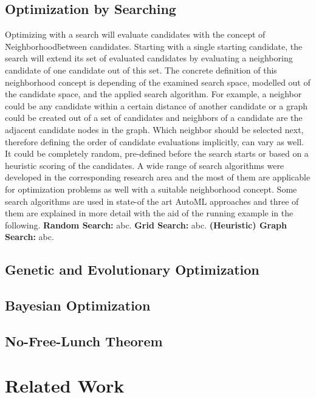 \subsection{Optimization by Searching}
\label{sec:theory:optimization:search}
Optimizing with a search will evaluate candidates with the concept of \"Neighborhood\" between candidates.
Starting with a single starting candidate, the search will extend its set of evaluated candidates by evaluating a neighboring candidate of one candidate out of this set.
The concrete definition of this neighborhood concept is depending of the examined search space, modelled out of the candidate space, and the applied search algorithm.
For example, a neighbor could be any candidate within a certain distance of another candidate or a graph could be created out of a set of candidates and neighbors of a candidate are the adjacent candidate nodes in the graph.
Which neighbor should be selected next, therefore defining the order of candidate evaluations implicitly, can vary as well.
It could be completely random, pre-defined before the search starts or based on a heuristic scoring of the candidates.\newline
A wide range of search algorithms were developed in the corresponding research area and the most of them are applicable for optimization problems as well with a suitable neighborhood concept.
Some search algorithms are used in state-of the art AutoML approaches and three of them are explained in more detail with the aid of the running example in the following.\newline
\newline
\textbf{Random Search:} abc.\newline
\newline
\textbf{Grid Search:} abc.\newline
\newline
\textbf{(Heuristic) Graph Search:} abc.

\subsection{Genetic and Evolutionary Optimization}
\label{sec:theory:optimization:genetic}

\Blindtext

\subsection{Bayesian Optimization}
\label{sec:theory:optimization:bayesian}

\Blindtext

\subsection{No-Free-Lunch Theorem}
\label{sec:theory:optimization:lunch}

\Blindtext

\section{Related Work}
\label{sec:theory:related}

\Blindtext
